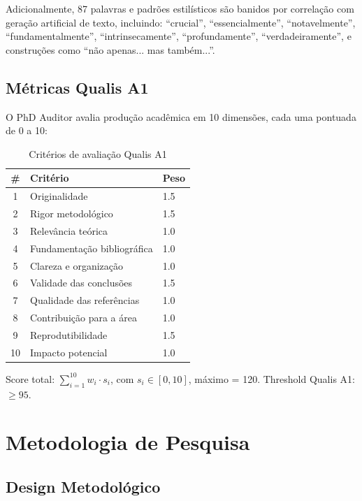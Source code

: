 \documentclass[12pt,a4paper,sumario=tradicional]{abntex2}
\begin{document}
Adicionalmente, 87 palavras e padrões estilísticos são banidos por correlação com geração artificial de texto, incluindo: ``crucial'', ``essencialmente'', ``notavelmente'', ``fundamentalmente'', ``intrinsecamente'', ``profundamente'', ``verdadeiramente'', e construções como ``não apenas... mas também...''.

\section{Métricas Qualis A1}

O PhD Auditor avalia produção acadêmica em 10 dimensões, cada uma pontuada de 0 a 10:

\begin{table}[H]
\centering
\caption{Critérios de avaliação Qualis A1}
\label{tab:qualis}
\begin{tabular}{@{}cll@{}}
\toprule
\textbf{\#} & \textbf{Critério} & \textbf{Peso} \\
\midrule
1 & Originalidade & 1.5 \\
2 & Rigor metodológico & 1.5 \\
3 & Relevância teórica & 1.0 \\
4 & Fundamentação bibliográfica & 1.0 \\
5 & Clareza e organização & 1.0 \\
6 & Validade das conclusões & 1.5 \\
7 & Qualidade das referências & 1.0 \\
8 & Contribuição para a área & 1.0 \\
9 & Reprodutibilidade & 1.5 \\
10 & Impacto potencial & 1.0 \\
\bottomrule
\end{tabular}
\end{table}

Score total: $\sum_{i=1}^{10} w_i \cdot s_i$, com $s_i \in [0,10]$, máximo = 120. Threshold Qualis A1: $\geq 95$.

\chapter{Metodologia de Pesquisa}

\section{Design Metodológico}
\end{document}
